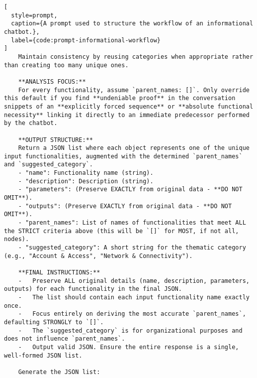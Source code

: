\begin{lstlisting}[
  style=prompt,
  caption={A prompt used to structure the workflow of an informational chatbot.},
  label={code:prompt-informational-workflow}
]
    Maintain consistency by reusing categories when appropriate rather than creating too many unique ones.

    **ANALYSIS FOCUS:**
    For every functionality, assume `parent_names: []`. Only override this default if you find **undeniable proof** in the conversation snippets of an **explicitly forced sequence** or **absolute functional necessity** linking it directly to an immediate predecessor performed by the chatbot.

    **OUTPUT STRUCTURE:**
    Return a JSON list where each object represents one of the unique input functionalities, augmented with the determined `parent_names` and `suggested_category`.
    - "name": Functionality name (string).
    - "description": Description (string).
    - "parameters": (Preserve EXACTLY from original data - **DO NOT OMIT**).
    - "outputs": (Preserve EXACTLY from original data - **DO NOT OMIT**).
    - "parent_names": List of names of functionalities that meet ALL the STRICT criteria above (this will be `[]` for MOST, if not all, nodes).
    - "suggested_category": A short string for the thematic category (e.g., "Account & Access", "Network & Connectivity").

    **FINAL INSTRUCTIONS:**
    -   Preserve ALL original details (name, description, parameters, outputs) for each functionality in the final JSON.
    -   The list should contain each input functionality name exactly once.
    -   Focus entirely on deriving the most accurate `parent_names`, defaulting STRONGLY to `[]`.
    -   The `suggested_category` is for organizational purposes and does not influence `parent_names`.
    -   Output valid JSON. Ensure the entire response is a single, well-formed JSON list.

    Generate the JSON list:
\end{lstlisting}
